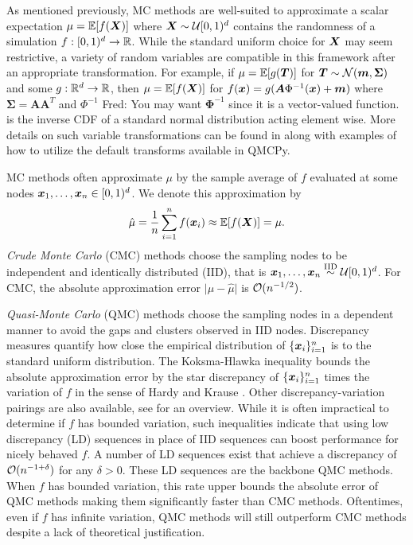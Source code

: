 \documentclass{article}[12pt]
\newcommand{\FJHComment}[1]{{\color{purple}Fred:  #1}}
\begin{document}
As mentioned previously, MC methods are well-suited to approximate a scalar expectation $\mu = \mathbb{E}[f(\boldsymbol{X})]$ where $\boldsymbol{X} \sim \mathcal{U}[0,1)^d$ contains the randomness of a simulation $f: [0,1)^{d} \to \mathbb{R}$. While the standard uniform choice for $\boldsymbol{X}$ may seem restrictive, a variety of random variables are compatible in this framework after an appropriate transformation. For example, if $\mu = \mathbb{E}[g(\boldsymbol{T})]$ for $\boldsymbol{T} \sim \mathcal{N}(\boldsymbol{m},\boldsymbol{\Sigma})$ and some $g: \mathbb{R}^{d} \to \mathbb{R}$, then $\mu = \mathbb{E}[f(\boldsymbol{X})]$ for  $f(\boldsymbol{x})=g(\boldsymbol{A}\Phi^{-1}(\boldsymbol{x})+\boldsymbol{m})$ where $\boldsymbol{\Sigma}=\boldsymbol{A}\boldsymbol{A}^T$ and $\Phi^{-1}$ \FJHComment{You may want $\boldsymbol{\Phi}^{-1}$ since it is a vector-valued function.} is the inverse CDF of a standard normal distribution acting element wise. More details on such variable transformations can be found in \cite{QMCSoftware} along with examples of how to utilize the default transforms available in QMCPy.

MC methods often approximate $\mu$ by the sample average of $f$ evaluated at some nodes $\boldsymbol{x}_1,\dots,\boldsymbol{x}_n \in [0,1)^d$. We denote this approximation by  
\begin{equation}
    \label{eq:mcapprox}
    \hat{\mu} = \frac{1}{n}\sum_{i=1}^n f(\boldsymbol{x}_i) \approx \mathbb{E}[f(\boldsymbol{X})] = \mu. 
\end{equation}
\emph{Crude Monte Carlo} (CMC) methods choose the sampling nodes to be independent and identically distributed (IID), that is $\boldsymbol{x}_1,\dots,\boldsymbol{x}_n \overset{\text{IID}}{\sim} \mathcal{U}[0,1)^{d}$. For CMC, the absolute approximation error $\lvert \mu - \hat{\mu} \rvert$ is $\mathcal{O}(n^{-1/2})$. 

\emph{Quasi-Monte Carlo} (QMC) methods choose the sampling nodes in a dependent manner to avoid the gaps and clusters observed in IID nodes. Discrepancy measures quantify how close the empirical distribution of $\{\boldsymbol{x}_i\}_{i=1}^n$ is to the standard uniform distribution. The Koksma-Hlawka inequality bounds the absolute approximation error by the star discrepancy of $\{\boldsymbol{x}_i\}_{i=1}^n$ times the variation of $f$ in the sense of Hardy and Krause \cite{dick2013high}. Other discrepancy-variation pairings are also available, see \cite{hickernell1998generalized} for an overview. While it is often impractical to determine if $f$ has bounded variation, such inequalities indicate that using low discrepancy (LD) sequences in place of IID sequences can boost performance for nicely behaved $f$. A number of LD sequences exist that achieve a discrepancy of $\mathcal{O}(n^{-1+\delta})$ for any $\delta > 0$. These LD sequences are the backbone QMC methods. When $f$ has bounded variation, this rate upper bounds the absolute error of QMC methods making them significantly faster than CMC methods. Oftentimes, even if $f$ has infinite variation, QMC methods will still outperform CMC methods despite a lack of theoretical justification. 
\end{document}
